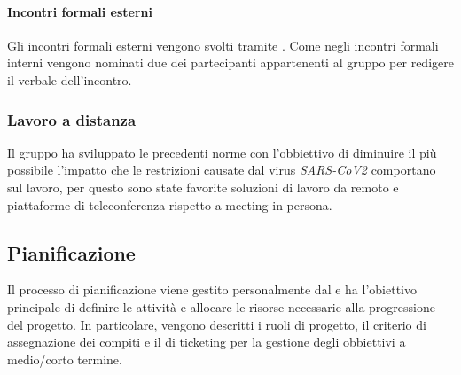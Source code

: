 \paragraph*{Incontri formali esterni}
Gli incontri formali esterni vengono svolti tramite . Come negli incontri formali interni vengono nominati due dei partecipanti appartenenti al gruppo per redigere il verbale dell'incontro. 

\subsubsection{Lavoro a distanza}
Il gruppo ha sviluppato le precedenti norme con l'obbiettivo di diminuire il più possibile l'impatto che le restrizioni causate dal virus \textit{SARS-CoV2} comportano sul lavoro, per questo sono state favorite soluzioni di lavoro da remoto e piattaforme di teleconferenza rispetto a meeting in persona.

\subsection{Pianificazione}

Il processo di pianificazione viene gestito personalmente dal \RdP{} e ha l'obiettivo principale di definire le attività e allocare le risorse necessarie alla progressione del progetto. In particolare, vengono descritti i ruoli di progetto, il criterio di assegnazione dei compiti e il  di ticketing per la gestione degli obbiettivi a medio/corto termine.
